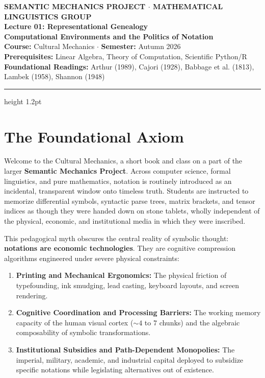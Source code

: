 \documentclass[11pt,letterpaper]{article}
\begin{document}
\begin{center}
    {\small\sffamily\bfseries\color{darkslate} SEMANTIC MECHANICS PROJECT $\cdot$ MATHEMATICAL LINGUISTICS GROUP}\\[0.7em]
    {\LARGE\bfseries\color{primaryblue} Lecture 01: Representational Genealogy}\\[0.35em]
    {\Large\bfseries\color{primaryblue} Computational Environments and the Politics of Notation}\\[0.4em]
    {\normalsize\sffamily\color{darkslate} \textbf{Course:} Cultural Mechanics $\cdot$ \textbf{Semester:} Autumn 2026}\\[0.25em]
    {\small\sffamily\color{darkslate!80} \textbf{Prerequisites:} Linear Algebra, Theory of Computation, Scientific Python/R}\\[0.25em]
    {\small\sffamily\color{darkslate!80} \textbf{Foundational Readings:} Arthur (1989), Cajori (1928), Babbage et al. (1813), Lambek (1958), Shannon (1948)}
\end{center}
\vspace{0.1em}
\hrule height 1.2pt \vspace{0.7em}

\section{The Foundational Axiom}

Welcome to the Cultural Mechanics, a short book and class on a part of the larger \textbf{Semantic Mechanics Project}. Across computer science, formal linguistics, and pure mathematics, notation is routinely introduced as an incidental, transparent window onto timeless truth. Students are instructed to memorize differential symbols, syntactic parse trees, matrix brackets, and tensor indices as though they were handed down on stone tablets, wholly independent of the physical, economic, and institutional media in which they were inscribed.

This pedagogical myth obscures the central reality of symbolic thought: \textbf{notations are economic technologies}. They are cognitive compression algorithms engineered under severe physical constraints:
\begin{enumerate}[noitemsep,topsep=1pt]
    \item \textbf{Printing and Mechanical Ergonomics:} The physical friction of typefounding, ink smudging, lead casting, keyboard layouts, and screen rendering.
    \item \textbf{Cognitive Coordination and Processing Barriers:} The working memory capacity of the human visual cortex ($\sim 4$ to $7$ chunks) and the algebraic composability of symbolic transformations.
    \item \textbf{Institutional Subsidies and Path-Dependent Monopolies:} The imperial, military, academic, and industrial capital deployed to subsidize specific notations while legislating alternatives out of existence.
\end{enumerate}
\end{document}
